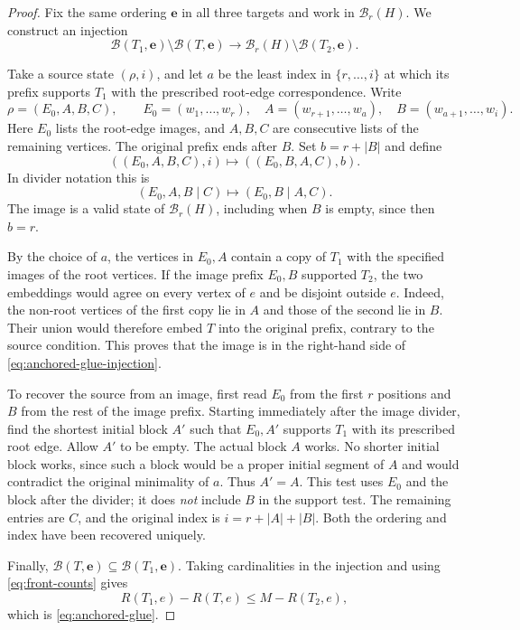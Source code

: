 \documentclass[11pt]{article}
\numberwithin{equation}{section}
\theoremstyle{definition}
\begin{document}
\begin{proof}
Fix the same ordering $\mathbf e$ in all three targets and work in
$\mathcal B_r(H)$.  We construct an injection
\begin{equation}
 \mathcal B(T_1,\mathbf e)\setminus\mathcal B(T,\mathbf e)
 \longrightarrow
 \mathcal B_r(H)\setminus\mathcal B(T_2,\mathbf e).
 \label{eq:anchored-glue-injection}
\end{equation}

Take a source state $(\rho,i)$, and let $a$ be the least index in
$\{r,\ldots,i\}$ at which its prefix supports $T_1$ with the prescribed
root-edge correspondence.  Write
\[
 \rho=(E_0,A,B,C),\qquad
 E_0=(w_1,\ldots,w_r),\quad
 A=(w_{r+1},\ldots,w_a),\quad B=(w_{a+1},\ldots,w_i).
\]
Here $E_0$ lists the root-edge images, and $A,B,C$ are consecutive
lists of the remaining vertices.  The original prefix ends after $B$.
Set $b=r+|B|$ and define
\begin{equation}
 ((E_0,A,B,C),i)\longmapsto ((E_0,B,A,C),b).
 \label{eq:anchored-rotation}
\end{equation}
In divider notation this is
\[
 (E_0,A,B\mid C)\longmapsto(E_0,B\mid A,C).
\]
The image is a valid state of $\mathcal B_r(H)$, including when $B$
is empty, since then $b=r$.

By the choice of $a$, the vertices in $E_0,A$ contain a copy of $T_1$
with the specified images of the root vertices.  If the image prefix
$E_0,B$ supported $T_2$, the
two embeddings would agree on every vertex of $e$ and be disjoint
outside $e$.  Indeed, the non-root vertices of the first copy lie in
$A$ and those of the second lie in $B$.  Their union would therefore
embed $T$ into the original prefix, contrary to the source condition.
This proves that the image is in the right-hand side of
\eqref{eq:anchored-glue-injection}.

To recover the source from an image, first read $E_0$ from the first
$r$ positions and $B$ from the rest of the image prefix.  Starting
immediately after the image divider, find the shortest initial block
$A'$ such that $E_0,A'$ supports $T_1$ with its prescribed root edge.
Allow $A'$ to be empty.  The actual block $A$ works.  No shorter
initial block works, since such a block would be a proper initial
segment of $A$ and would contradict the original minimality of $a$.
Thus $A'=A$.  This test uses $E_0$ and the block after the divider;
it does \emph{not} include $B$ in the support test.  The remaining
entries are $C$, and the original index is
$i=r+|A|+|B|$.  Both the ordering and index have been recovered uniquely.

Finally, $\mathcal B(T,\mathbf e)\subseteq\mathcal B(T_1,\mathbf e)$.
Taking cardinalities in the injection and using
\eqref{eq:front-counts} gives
\[
 R(T_1,e)-R(T,e)\leq M-R(T_2,e),
\]
which is \eqref{eq:anchored-glue}.
\end{proof}
\end{document}
